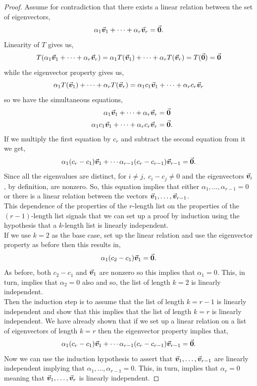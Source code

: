 \documentclass[MathsNotesBase.tex]{subfiles}
\begin{document}
{		\bigskip
		\begin{proof}
			Assume for contradiction that there exists a linear relation between the set of eigenvectors,
			\[ \alpha_1\vec{\bm{v}}_1 + \cdots + \alpha_r\vec{\bm{v}}_r = \vec{\bm{0}}. \]
			Linearity of $T$ gives us,
			\[ T(\alpha_1\vec{\bm{v}}_1 + \cdots + \alpha_r\vec{\bm{v}}_r) = \alpha_1T(\vec{\bm{v}}_1) + \cdots + \alpha_rT(\vec{\bm{v}}_r) = T(\vec{\bm{0}}) = \vec{\bm{0}} \]
			while the eigenvector property gives us,
			\[ \alpha_1T(\vec{\bm{v}}_1) + \cdots + \alpha_rT(\vec{\bm{v}}_r) = \alpha_1c_1\vec{\bm{v}}_1 + \cdots + \alpha_rc_r\vec{\bm{v}}_r \]
			so we have the simultaneous equations,
			\begin{align*}
			&& \alpha_1\vec{\bm{v}}_1 + \cdots + \alpha_r\vec{\bm{v}}_r &= \vec{\bm{0}}  \\
			&& \alpha_1c_1\vec{\bm{v}}_1 + \cdots + \alpha_rc_r\vec{\bm{v}}_r &= \vec{\bm{0}}.
			\end{align*}
			If we multiply the first equation by $c_r$ and subtract the second equation from it we get,
			\[ \alpha_1(c_r - c_1)\vec{\bm{v}}_1 + \cdots \alpha_{r-1}(c_r - c_{r-1})\vec{\bm{v}}_{r-1} = \vec{\bm{0}}. \]
			Since all the eigenvalues are distinct, for ${ i \neq j,\; c_i - c_j \neq 0 }$ and the eigenvectors $\vec{\bm{v}}_i$, by definition, are nonzero. So, this equation implies that either ${ \alpha_1,\dots,\alpha_{r-1} = 0 }$ or there is a linear relation between the vectors ${ \vec{\bm{v}}_1,\dots,\vec{\bm{v}}_{r-1} }$.\\
			This dependence of the properties of the $r$-length list on the properties of the ${ (r-1) }$-length list signals that we can set up a proof by induction using the hypothesis that a $k$-length list is linearly independent.\\
			If we use ${ k = 2 }$ as the base case, set up the linear relation and use the eigenvector property as before then this results in,
			\[ \alpha_1(c_2 - c_1)\vec{\bm{v}}_1 = \vec{\bm{0}}. \]
			As before, both ${ c_2 - c_1 }$ and $\vec{\bm{v}}_1$ are nonzero so this implies that ${ \alpha_1 = 0 }$. This, in turn, implies that ${ \alpha_2 = 0 }$ also and so, the list of length ${ k = 2 }$ is linearly independent.\\
			Then the induction step is to assume that the list of length ${ k = r-1 }$ is linearly independent and show that this implies that the list of length ${ k = r }$ is linearly independent. We have already shown that if we set up a linear relation on a list of eigenvectors of length ${ k = r }$ then the eigenvector property implies that,
			\[ \alpha_1(c_r - c_1)\vec{\bm{v}}_1 + \cdots \alpha_{r-1}(c_r - c_{r-1})\vec{\bm{v}}_{r-1} = \vec{\bm{0}}. \]
			Now we can use the induction hypothesis to assert that ${ \vec{\bm{v}}_1,\dots,\vec{\bm{v}}_{r-1} }$ are linearly independent implying that ${ \alpha_1,\dots,\alpha_{r-1} = 0 }$. This, in turn, implies that ${ \alpha_r = 0 }$ meaning that ${ \vec{\bm{v}}_1,\dots,\vec{\bm{v}}_r }$ is linearly independent.
		\end{proof}
	
}
\end{document}
